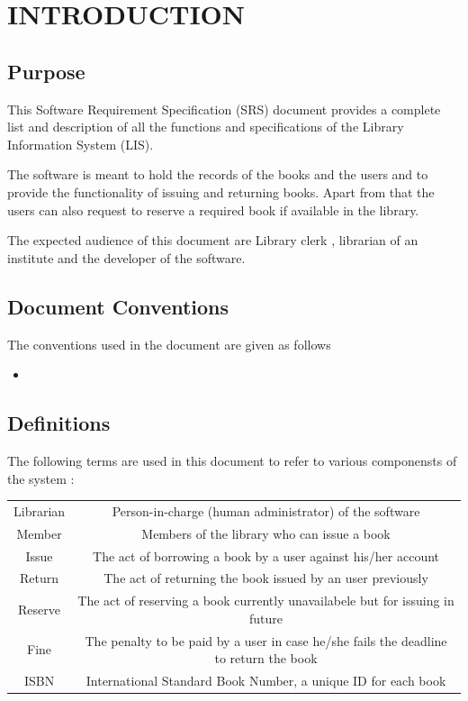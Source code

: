 \documentclass{article}
\begin{document}

\section{INTRODUCTION}

\subsection{Purpose}
This Software Requirement Specification (SRS) document provides a complete list and description of all the functions and specifications of the Library Information System (LIS).

The software is meant to hold the records of the books and the users and to provide the functionality of issuing and returning books. Apart from that the users can also request to reserve a required book if available in the library.

The expected audience of this document are Library clerk , librarian of an institute and the developer of the software.

\subsection{Document Conventions}
The conventions used in the document are given as follows
\begin{itemize}
\item 
\end{itemize}

\subsection{Definitions}
The following terms are used in this document to refer to various componensts of the system :\\

\begin{tabular}{ c| c }
 Librarian & Person-in-charge (human administrator) of the software\\
 Member & Members of the library who can issue a book\\
 Issue & The act of borrowing a book by a user against his/her account\\
 Return & The act of returning the book issued by an user previously \\
 Reserve & The act of reserving a book currently unavailabele but for issuing in future\\
 Fine & The penalty to be paid by a user in case he/she fails the deadline to return the book\\
 ISBN & International Standard Book Number, a unique ID for each book
\end{tabular}	
\end{document}
